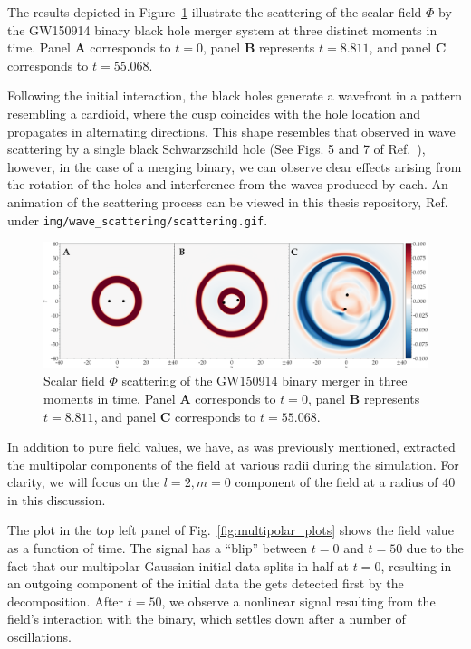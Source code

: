 The results depicted in Figure~\ref{fig:wave_scattering_results} illustrate the scattering of the scalar field $\Phi$ by the GW150914 binary black hole merger system at three distinct moments in time. Panel \textbf{A} corresponds to $t = 0$, panel \textbf{B} represents $t = 8.811$, and panel \textbf{C} corresponds to $t = 55.068$.

Following the initial interaction, the black holes generate a wavefront in a pattern resembling a cardioid, where the cusp coincides with the hole location and propagates in alternating directions. This shape resembles that observed in wave scattering by a single black Schwarzschild hole (See Figs. 5 and 7 of Ref.~\cite{PhysRevD.84.104002}), however, in the case of a merging binary, we can observe clear effects arising from the rotation of the holes and interference from the waves produced by each. An animation of the scattering process can be viewed in this thesis repository, Ref.~\cite{ThesisRepo} under \texttt{img/wave\_scattering/scattering.gif}.

\begin{figure}[h]
  \centering
  \includegraphics[width=\linewidth]{img/wave_scattering/scattering_frames}
  \caption{Scalar field $\Phi$ scattering of the GW150914 binary merger in three moments in time. Panel \textbf{A} corresponds to $t = 0$, panel \textbf{B} represents $t = 8.811$, and panel \textbf{C} corresponds to $t = 55.068$.}
  \label{fig:wave_scattering_results}
\end{figure}

In addition to pure field values, we have, as was previously mentioned, extracted the multipolar components of the field at various radii during the simulation. For clarity, we will focus on the $l=2,m=0$ component of the field at a radius of $40$ in this discussion.

The plot in the top left panel of Fig.~\ref{fig:multipolar_plots} shows the field value as a function of time. The signal has a ``blip'' between $t=0$ and $t=50$ due to the fact that our multipolar Gaussian initial data splits in half at $t=0$, resulting in an outgoing component of the initial data the gets detected first by the decomposition. After $t=50$, we observe a nonlinear signal resulting from the field's interaction with the binary, which settles down after a number of oscillations.

